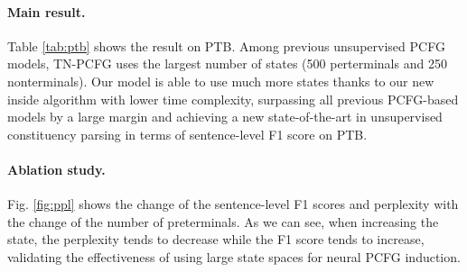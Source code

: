 \documentclass[11pt]{article}
\begin{document}
\begin{table}[tb!]
    \centering 
    \caption{Results on PTB. S-F1: sentence-level F1. PTs: preterminals. NTs: nonterminals.}
    \label{tab:ptb}
\end{table}


\paragraph{Main result.} Table \ref{tab:ptb} shows the result on PTB. Among previous unsupervised PCFG models, TN-PCFG \cite{yang-etal-2021-pcfgs} uses the largest number of states (500 perterminals and 250 nonterminals). Our model is able to use much more states thanks to our new inside algorithm with lower time complexity, surpassing all previous PCFG-based models by a large margin and achieving a new state-of-the-art in unsupervised constituency parsing in terms of sentence-level F1 score on PTB.

\paragraph{Ablation study.} Fig. \ref{fig:ppl} shows the change of the sentence-level F1 scores and perplexity with the change of the number of preterminals.
As we can see, when increasing the state, the perplexity tends to decrease while
the F1 score tends to increase, validating the effectiveness of using large state spaces for neural PCFG induction. 
\end{document}
